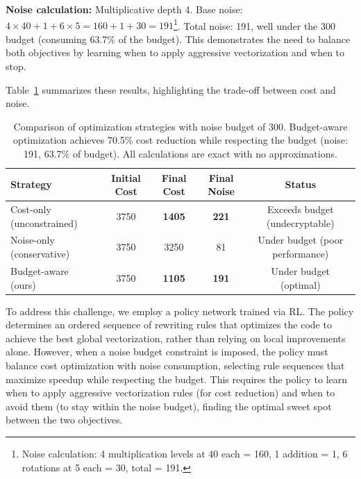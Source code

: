 \textbf{Noise calculation:} Multiplicative depth 4. Base noise: $4 \times 40 + 1 + 6 \times 5 = 160 + 1 + 30 = 191$\footnote{Noise calculation: 4 multiplication levels at 40 each = 160, 1 addition = 1, 6 rotations at 5 each = 30, total = 191.}. Total noise: 191, well under the 300 budget (consuming 63.7\% of the budget). This demonstrates the need to balance both objectives by learning when to apply aggressive vectorization and when to stop.

Table~\ref{tab:constrained-comparison} summarizes these results, highlighting the trade-off between cost and noise.

\begin{table}[h]
\centering
\small
\begin{tabular}{lcccc}
\hline
\textbf{Strategy} & \textbf{Initial Cost} & \textbf{Final Cost} & \textbf{Final Noise} & \textbf{Status} \\
\hline
Cost-only (unconstrained) & 3750 & \textbf{1405} & \textbf{221} & Exceeds budget (undecryptable) \\
Noise-only (conservative) & 3750 & 3250 & 81 & Under budget (poor performance) \\
Budget-aware (ours) & 3750 & \textbf{1105} & \textbf{191} & Under budget (optimal) \\
\hline
\end{tabular}
\caption{Comparison of optimization strategies with noise budget of 300. Budget-aware optimization achieves 70.5\% cost reduction while respecting the budget (noise: 191, 63.7\% of budget). All calculations are exact with no approximations.}
\label{tab:constrained-comparison}
\end{table}

To address this challenge, we employ a policy network trained via RL. The policy determines an ordered sequence of rewriting rules that optimizes the code to achieve the best global vectorization, rather than relying on local improvements alone. However, when a noise budget constraint is imposed, the policy must balance cost optimization with noise consumption, selecting rule sequences that maximize speedup while respecting the budget. This requires the policy to learn when to apply aggressive vectorization rules (for cost reduction) and when to avoid them (to stay within the noise budget), finding the optimal sweet spot between the two objectives.

